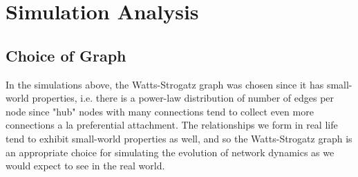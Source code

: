 \documentclass[11pt]{article}
\begin{document}
    
    \begin{center}
    \end{center}

    
    \begin{center}
    \end{center}

    
    \begin{center}
    \end{center}

    
    \begin{center}
    \end{center}

    
    \begin{center}
    \end{center}

    
    \begin{center}
    \end{center}

    
\section{Simulation Analysis}

\subsection{Choice of Graph}

In the simulations above, the Watts-Strogatz graph was chosen since it
has small-world properties, i.e. there is a power-law distribution of
number of edges per node since "hub" nodes with many connections tend to
collect even more connections a la preferential attachment. The
relationships we form in real life tend to exhibit small-world
properties as well, and so the Watts-Strogatz graph is an appropriate
choice for simulating the evolution of network dynamics as we would
expect to see in the real world.
\end{document}
